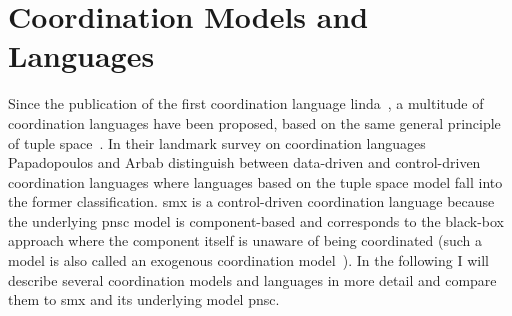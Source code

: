 \section{Coordination Models and Languages}
\label{sect_related_coord}
Since the publication of the first coordination language \gls*{linda}~\cite{gelernter1992}, a multitude of coordination languages have been proposed, based on the same general principle of tuple space~\cite{rossi2001, omicini2011}.
In their landmark survey on coordination languages~\cite{papadopoulos1998} Papadopoulos and Arbab distinguish between data-driven and control-driven coordination languages where languages based on the tuple space model fall into the former classification.
\Gls*{smx} is a control-driven coordination language because the underlying \gls{pnsc} model is component-based and corresponds to the black-box approach where the component itself is unaware of being coordinated (such a model is also called an exogenous coordination model~\cite{arbab2006}).
In the following I will describe several coordination models and languages in more detail and compare them to \gls*{smx} and its underlying model \gls{pnsc}.




